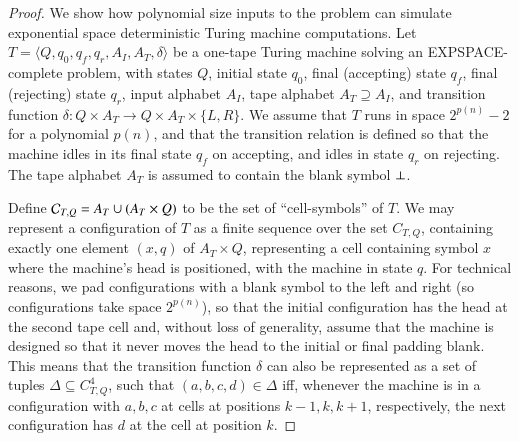 \documentclass[a4wide]{article}
\newcommand{\C}{{\cal C}}
\theoremstyle{examplesty}
\begin{document}
\begin{proof} 
We show how polynomial size inputs to the problem can simulate exponential space deterministic Turing machine computations. 
Let $T= \langle Q, q_0, q_f, 
q_r,  
 A_I,A_T, \delta\rangle$ be a one-tape Turing machine solving an EXPSPACE-complete problem, 
with states $Q$, initial state $q_0$, final (accepting) state $q_f$, 
final (rejecting) state $q_r$, 
input alphabet $A_I$, tape alphabet $A_T\supseteq A_I$, 
and transition function $\delta: Q\times A_T\rightarrow Q\times A_T\times \{L,R\}$.   We assume that $T$ runs in space 
 $2^{p(n)}-2$ for a polynomial $p(n)$, and that the transition relation is defined so that the machine idles in 
 its final state 
$q_f$
 on accepting, and idles in 
state $q_r$
 on rejecting. The tape alphabet $A_T$ is assumed to 
 contain the blank symbol $\bot$. 
 
Define
 $\C_{T,Q} = A_T \cup (A_T\times Q)$ to be the set of ``cell-symbols'' of $T$. 
We may represent a configuration of $T$ as a finite sequence 
over the set $C_{T,Q}$, containing exactly one element $(x,q)$ of $A_T\times Q$, 
representing a cell containing symbol $x$ where the machine's head 
is positioned, with the machine in state $q$.  For technical reasons, 
we pad configurations with a blank symbol to the left and right (so configurations 
take space $2^{p(n)}$), so that the initial configuration has the head at the second tape cell 
and,  without loss of generality, assume that the machine is designed so that it never moves the head to the initial 
or final 
padding blank. 
This means that the transition function $\delta$ can also be represented as a set of 
tuples 
$\Delta \subseteq C_{T,Q}^4$, 
such that $(a,b,c,d)\in \Delta$ iff, whenever the machine is in a configuration 
with $a,b,c$ at cells at positions $k-1,k,k+1$, respectively, the next configuration has $d$ at the cell at position $k$. 


\end{proof}
\end{document}
